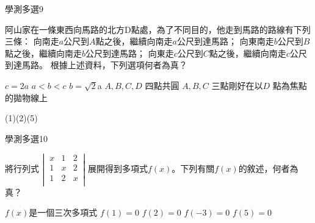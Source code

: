 \begin{QUESTIONS}
\begin{QUESTION}
        \begin{ExamInfo}{89}{學測}{多選}{9}
        \end{ExamInfo}
        \begin{ExamAnsRateInfo}{}{}{}{}
        \end{ExamAnsRateInfo}
        \begin{QBODY}
		阿山家在一條東西向馬路的北方D點處，為了不同目的，他走到馬路的路線有下列三條：
		向南走$a$公尺到$A$點之後，繼續向南走$a$公尺到達馬路；
		向東南走$b$公尺到$B$點之後，繼續向南走$b$公尺到達馬路；
		向東走$c$公尺到$C$點之後，繼續向南走$c$公尺到達馬路。
		根據上述資料，下列選項何者為真？
		\begin{QOPS}
			\QOP $c=2a$
			\QOP $a<b<c$
			\QOP $b=\sqrt{2}$a
			\QOP $A,B,C,D$ 四點共圓
			\QOP $A,B,C$ 三點剛好在以$D$ 點為焦點的拋物線上
		\end{QOPS}
        \end{QBODY}
        \begin{QFROMS}
        \end{QFROMS}
        \begin{QTAGS}\end{QTAGS}
        \begin{QANS}
		(1)(2)(5)
        \end{QANS}
        \begin{QSOLLIST}
        \end{QSOLLIST}
        \begin{QEMPTYSPACE}
        \end{QEMPTYSPACE}
    \end{QUESTION}
    \begin{QUESTION}
        \begin{ExamInfo}{89}{學測}{多選}{10}
        \end{ExamInfo}
        \begin{ExamAnsRateInfo}{}{}{}{}
        \end{ExamAnsRateInfo}
        \begin{QBODY}
			將行列式
				$\left| \begin{matrix}
				   \ x & 1 & 2\   \\
				   \ 1 & x & 2\   \\
				   \ 1 & 2 & x  \\
				\end{matrix} \right|$
				展開得到多項式$f(x)$。下列有關$f(x)$的敘述，何者為真？
				\begin{QOPS}
					\QOP $f(x)$是一個三次多項式
					\QOP $f(1)=0$
					\QOP $f(2)=0$
					\QOP $f(-3)=0$
					\QOP $f(5)=0$

\end{QOPS}
\end{QBODY}
\end{QUESTION}
\end{QUESTIONS}
